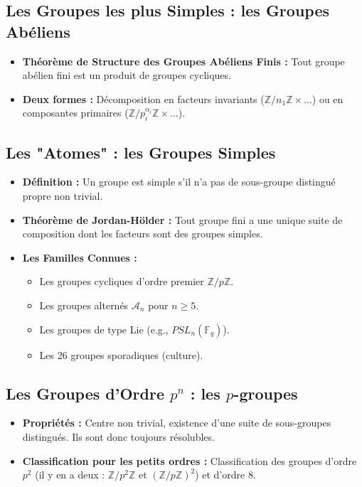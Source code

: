 \documentclass[12pt, a4paper, parskip=full]{report}
\theoremstyle{agregstyle}
\begin{document}
\subsection{Les Groupes les plus Simples : les Groupes Abéliens}
\begin{itemize}
    \item \textbf{Théorème de Structure des Groupes Abéliens Finis :} Tout groupe abélien fini est un produit de groupes cycliques.
    \item \textbf{Deux formes :} Décomposition en facteurs invariants ($\mathbb{Z}/n_1\mathbb{Z} \times \dots$) ou en composantes primaires ($\mathbb{Z}/p_i^{\alpha_i}\mathbb{Z} \times \dots$).
\end{itemize}
\subsection{Les "Atomes" : les Groupes Simples}
\begin{itemize}
    \item \textbf{Définition :} Un groupe est simple s'il n'a pas de sous-groupe distingué propre non trivial.
    \item \textbf{Théorème de Jordan-Hölder :} Tout groupe fini a une unique suite de composition dont les facteurs sont des groupes simples.
    \item \textbf{Les Familles Connues :}
        \begin{itemize}
            \item Les groupes cycliques d'ordre premier $\mathbb{Z}/p\mathbb{Z}$.
            \item Les groupes alternés $\mathcal{A}_n$ pour $n \ge 5$.
            \item Les groupes de type Lie (e.g., $PSL_n(\mathbb{F}_q)$).
            \item Les 26 groupes sporadiques (culture).
        \end{itemize}
\end{itemize}
\subsection{Les Groupes d'Ordre $p^n$ : les $p$-groupes}
\begin{itemize}
    \item \textbf{Propriétés :} Centre non trivial, existence d'une suite de sous-groupes distingués. Ils sont donc toujours résolubles.
    \item \textbf{Classification pour les petits ordres :} Classification des groupes d'ordre $p^2$ (il y en a deux : $\mathbb{Z}/p^2\mathbb{Z}$ et $(\mathbb{Z}/p\mathbb{Z})^2$) et d'ordre 8.
\end{itemize}
\end{document}
